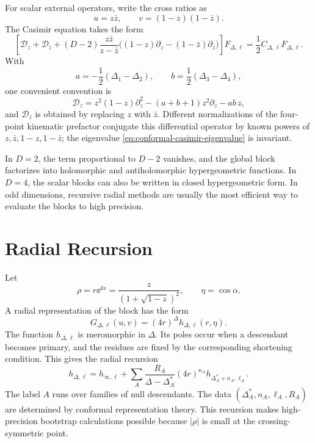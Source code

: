 For scalar external operators, write the cross ratios as
\[
  u=z\bar z,
  \qquad
  v=(1-z)(1-\bar z).
\]
The Casimir equation takes the form
\begin{equation}
  \left[
    \mathcal D_z+\mathcal D_{\bar z}
    +(D-2)\frac{z\bar z}{z-\bar z}
    \bigl((1-z)\partial_z-(1-\bar z)\partial_{\bar z}\bigr)
  \right]F_{\Delta,\ell}
  =
  \frac12C_{\Delta,\ell}F_{\Delta,\ell}.
  \label{eq:casimir-z-zbar-equation}
\end{equation}
With
\[
  a=-\frac12(\Delta_1-\Delta_2),
  \qquad
  b=\frac12(\Delta_3-\Delta_4),
\]
one convenient convention is
\begin{equation}
  \mathcal D_z
  =
  z^2(1-z)\partial_z^2
  -
  (a+b+1)z^2\partial_z
  -
  ab\,z,
  \label{eq:one-variable-casimir-operator}
\end{equation}
and \(\mathcal D_{\bar z}\) is obtained by replacing
\(z\) with \(\bar z\).  Different normalizations of the four-point
kinematic prefactor conjugate this differential operator by known powers of
\(z,\bar z,1-z,1-\bar z\); the eigenvalue
\eqref{eq:conformal-casimir-eigenvalue} is invariant.

In \(D=2\), the term proportional to \(D-2\) vanishes, and the global block
factorizes into holomorphic and antiholomorphic hypergeometric functions.  In
\(D=4\), the scalar blocks can also be written in closed hypergeometric form.
In odd dimensions, recursive radial methods are usually the most efficient
way to evaluate the blocks to high precision.

\section{Radial Recursion}

Let
\[
  \rho=r\ee^{\ii\alpha}
  =
  \frac{z}{(1+\sqrt{1-z})^2},
  \qquad
  \eta=\cos\alpha.
\]
A radial representation of the block has the form
\begin{equation}
  G_{\Delta,\ell}(u,v)
  =
  (4r)^\Delta h_{\Delta,\ell}(r,\eta).
  \label{eq:block-radial-h}
\end{equation}
The function \(h_{\Delta,\ell}\) is meromorphic in \(\Delta\).  Its poles
occur when a descendant becomes primary, and the residues are fixed by the
corresponding shortening condition.  This gives the radial recursion
\begin{equation}
  h_{\Delta,\ell}
  =
  h_{\infty,\ell}
  +
  \sum_A
  \frac{R_A}{\Delta-\Delta_A^\ast}
  (4r)^{n_A}h_{\Delta_A^\ast+n_A,\ell_A}.
  \label{eq:block-radial-recursion}
\end{equation}
The label \(A\) runs over families of null descendants.  The data
\((\Delta_A^\ast,n_A,\ell_A,R_A)\) are determined by conformal
representation theory.  This recursion makes high-precision bootstrap
calculations possible because \(|\rho|\) is small at the crossing-symmetric
point.

